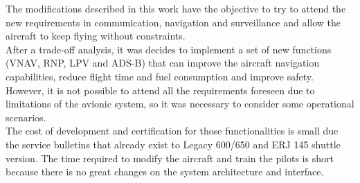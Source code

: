 The modifications described in this work have the objective to try to attend the new requirements in communication, navigation and surveillance and allow  the aircraft to keep flying without constraints.
\\After a trade-off analysis, it was decides to implement a set of new functions (VNAV, RNP, LPV and ADS-B) that can improve the aircraft navigation capabilities, reduce flight time and fuel consumption and improve safety. However, it is not possible to attend all the requirements foreseen due to limitations of the avionic system, so it was necessary to consider some operational scenarios.
\\The cost of development and certification for those functionalities is small due the service bulletins that already exist to Legacy 600/650 and ERJ 145 shuttle version. The time required to modify the aircraft and train the pilots is short because there is no great changes on the system architecture and interface. 










